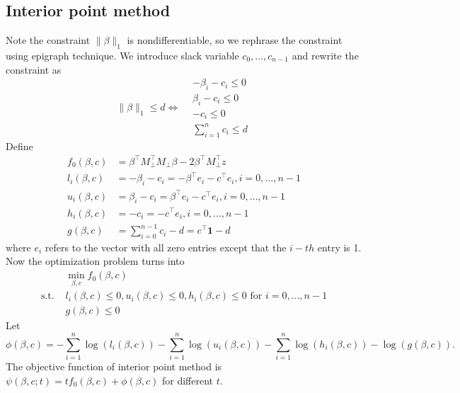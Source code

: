 \documentclass[final,onefignum,onetabnum]{siamart190516}
\begin{document}
\subsection{Interior point method}
Note the constraint $\|\beta\|_1$ is nondifferentiable, so we rephrase the constraint using epigraph technique. We introduce slack variable $c_0,\dots,c_{n-1}$ and rewrite the constraint as
\begin{equation}
   \|\beta\|_1\leq d \iff
    \begin{aligned}
    &-\beta_i- c_i\leq 0\\
    &\beta_i-c_i\leq 0\\
    &-c_i\leq 0\\
    &\sum_{i=1}^n c_i\leq d    
    \end{aligned}
\end{equation}
Define
\begin{equation}\label{func_val}
    \begin{aligned}
        f_0(\beta, c) &= \beta^\top M_{\perp}^\top M_{\perp}\beta-2\beta^\top M_{\perp}^\top z \\
    l_i(\beta, c) &= -\beta_i-c_i = -\beta^\top e_i-c^\top e_i, i = 0,\dots, n-1\\
    u_i(\beta, c) &= \beta_i - c_i = \beta^\top e_i - c^\top e_i, i = 0, \dots, n-1\\    
    h_i(\beta, c) &= -c_i = -c^\top e_i, i = 0, \dots, n-1\\
    g(\beta, c) &= \sum_{i=0}^{n-1} c_i - d = c^\top \mathbf{1} - d
    \end{aligned}
\end{equation}
where $e_i$ refers to the vector with all zero entries except that the $i-th$ entry is 1. Now the optimization problem turns into
\begin{equation}
\begin{aligned}
     &\min_{\beta,c} f_0(\beta,c)   \\
     \text{s.t. } & l_i(\beta, c)\leq 0, u_i(\beta, c)\leq 0, h_i(\beta, c)\leq 0\text{ for }i=0,\dots,n-1\\
     & g(\beta, c)\leq 0
\end{aligned}
\end{equation}
Let
\begin{equation}
    \phi(\beta, c) = -\sum_{i=1}^n \log (l_i(\beta, c)) - \sum_{i=1}^n \log (u_i(\beta, c)) - \sum_{i=1}^n \log (h_i(\beta, c)) -\log (g(\beta, c)).
\end{equation}
The objective function of interior point method is $\psi(\beta,c;t) = tf_0(\beta, c) + \phi(\beta, c)$ for different $t$.
\end{document}
